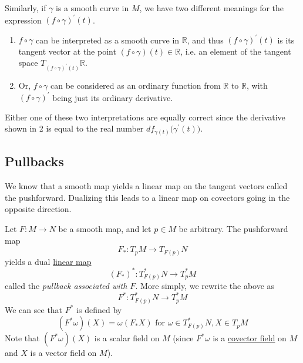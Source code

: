 \documentclass{article}
\newcounter{definition}[section]
\begin{document}
    Similarly, if $\gamma$ is a smooth curve in $M$, we have two different meanings for the expression $(f \circ \gamma)^\prime (t)$. 
    \begin{enumerate}
        \item $f \circ \gamma$ can be interpreted as a smooth curve in $\mathbb{R}$, and thus $(f \circ \gamma)^\prime (t)$ is its tangent vector at the point $(f \circ \gamma) (t) \in \mathbb{R}$, i.e. an element of the tangent space $T_{(f \circ \gamma)^\prime (t)} \mathbb{R}$. 
        \item Or, $f \circ \gamma$ can be considered as an ordinary function from $\mathbb{R}$ to $\mathbb{R}$, with $(f \circ \gamma)^\prime$ being just its ordinary derivative. 
    \end{enumerate}
    Either one of these two interpretations are equally correct since the derivative shown in 2 is equal to the real number $df_{\gamma(t)} \big( \gamma^\prime (t)\big)$. 

  \subsection{Pullbacks}

    We know that a smooth map yields a linear map on the tangent vectors called the pushforward. Dualizing this leads to a linear map on covectors going in the opposite direction. 

    \begin{definition}
      \label{def:pullback-of-a-covector}
    Let $F: M \to N$ be a smooth map, and let $p \in M$ be arbitrary. The pushforward map
    \begin{equation}
      F_* :T_p M \to T_{F(p)} N
    \end{equation}
    yields a dual \hyperref[lin-def:linear_map]{linear map} 
    \begin{equation}
      (F_*)^* : T_{F(p)}^* N \to T_p^* M
    \end{equation}
    called the \textit{pullback associated with $F$}. More simply, we rewrite the above as
    \begin{equation}
      F^*:T_{F(p)}^* N \to T_p^* M
    \end{equation}
    We can see that $F^*$ is defined by 
    \begin{equation}
      (F^* \omega)(X) = \omega (F_* X) \text{ for } \omega \in T^*_{F(p)} N, X \in T_p M
    \end{equation}
    Note that $(F^* \omega)(X)$ is a scalar field on $M$ (since $F^* \omega$ is a \hyperref[def:covector-field]{covector field} on $M$ and $X$ is a vector field on $M$). 
    \end{definition}
\end{document}
